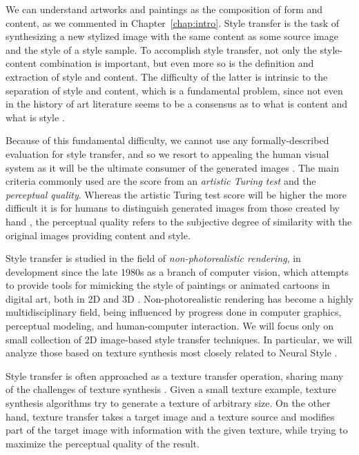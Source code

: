 We can understand artworks and paintings as the composition of form and content, as we commented in Chapter~\ref{chap:intro}.
Style transfer is the task of synthesizing a new stylized image with the same content as some source image and the style of a style sample.
To accomplish style transfer, not only the style-content combination is important, but even more so is the definition and extraction of style and content.
The difficulty of the latter is intrinsic to the separation of style and content, which is a fundamental problem, since not even in the history of art literature seems to be a consensus as to what is content and what is style \cite{Xie2007}.

Because of this fundamental difficulty, we cannot use any formally-described evaluation for style transfer, and so we resort to appealing the human visual system as it will be the ultimate consumer of the generated images \cite{Lin2011}.
The main criteria commonly used are the score from an \emph{artistic Turing test} and the \emph{perceptual quality}.
Whereas the artistic Turing test score will be higher the more difficult it is for humans to distinguish generated images from those created by hand \cite{Kyprianidis2013}, the perceptual quality refers to the subjective degree of similarity with the original images providing content and style.

Style transfer is studied in the field of \emph{non-photorealistic rendering}, in development since the late 1980s as a branch of computer vision, which attempts to provide tools for mimicking the style of paintings or animated cartoons in digital art, both in 2D and 3D \cite{Lee2010, Kyprianidis2013}.
Non-photorealistic rendering has become a highly multidisciplinary field, being influenced by progress done in computer graphics, perceptual modeling, and human-computer interaction.
We will focus only on small collection of 2D image-based style transfer techniques.
In particular, we will analyze those based on texture synthesis most closely related to Neural Style \cite{Gatys2015B}.

Style transfer is often approached as a texture transfer operation, sharing many of the challenges of texture synthesis \cite{Ashikhmin2003}.
Given a small texture example, texture synthesis algorithms try to generate a texture of arbitrary size.
On the other hand, texture transfer takes a target image and a texture source and modifies part of the target image with information with the given texture, while trying to maximize the perceptual quality of the result.


